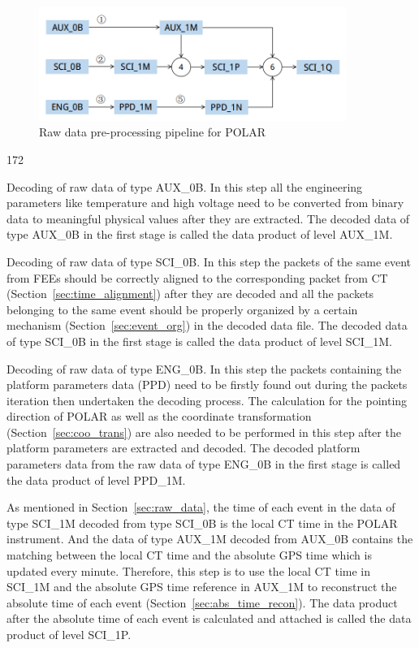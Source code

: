 \documentclass{raa}
\begin{document}
\begin{figure}[!ht]
\centering
\includegraphics[width=10cm]{images/preprocessing_pipeline.png}
\caption{Raw data pre-processing pipeline for POLAR}\label{fig:preprocessing_pipeline}
\end{figure}
\begin{dingautolist}{172}
\item Decoding of raw data of type AUX\_0B. In this step all the engineering parameters like temperature and high voltage need to be converted from binary data to meaningful physical values after they are extracted. The decoded data of type AUX\_0B in the first stage is called the data product of level AUX\_1M.
\item Decoding of raw data of type SCI\_0B. In this step the packets of the same event from FEEs should be correctly aligned to the corresponding packet from CT (Section~\ref{sec:time_alignment}) after they are decoded and all the packets belonging to the same event should be properly organized by a certain mechanism (Section~\ref{sec:event_org}) in the decoded data file. The decoded data of type SCI\_0B in the first stage is called the data product of level SCI\_1M.
\item Decoding of raw data of type ENG\_0B. In this step the packets containing the platform parameters data (PPD) need to be firstly found out during the packets iteration then undertaken the decoding process. The calculation for the pointing direction of POLAR as well as the coordinate transformation (Section~\ref{sec:coo_trans}) are also needed to be performed in this step after the platform parameters are extracted and decoded. The decoded platform parameters data from the raw data of type ENG\_0B in the first stage is called the data product of level PPD\_1M.
\item As mentioned in Section~\ref{sec:raw_data}, the time of each event in the data of type SCI\_1M decoded from type SCI\_0B is the local CT time in the POLAR instrument. And the data of type AUX\_1M decoded from AUX\_0B contains the matching between the local CT time and the absolute GPS time which is updated every minute. Therefore, this step is to use the local CT time in SCI\_1M and the absolute GPS time reference in AUX\_1M to reconstruct the absolute time of each event (Section~\ref{sec:abs_time_recon}). The data product after the absolute time of each event is calculated and attached is called the data product of level SCI\_1P.

\end{dingautolist}
\end{document}
